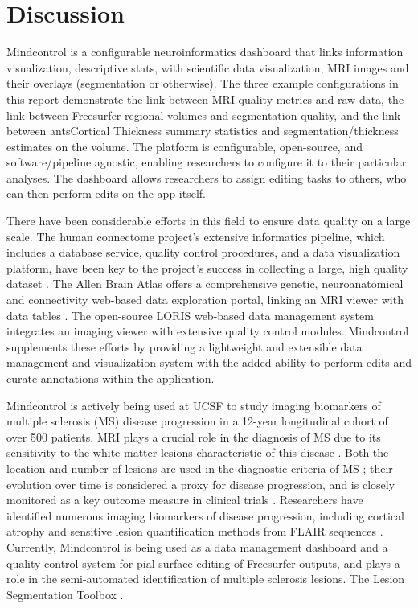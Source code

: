 \section{Discussion}

Mindcontrol is a configurable neuroinformatics dashboard that links information visualization, descriptive stats, with scientific data visualization, MRI images and their overlays (segmentation or otherwise). The three example configurations in this report demonstrate the link between MRI quality metrics and raw data, the link between Freesurfer regional volumes and segmentation quality, and the link between antsCortical Thickness summary statistics and segmentation/thickness estimates on the volume. The platform is configurable, open-source, and software/pipeline agnostic, enabling researchers to configure it to their particular analyses. The dashboard allows researchers to assign editing tasks to others, who can then perform edits on the app itself. 

There have been considerable efforts in this field to ensure data quality on a large scale. The human connectome project's extensive informatics pipeline, which includes a database service, quality control procedures, and a data visualization platform, have been key to the project's success in collecting a large, high quality dataset \cite{Marcus_2013}. The Allen Brain Atlas offers a comprehensive genetic, neuroanatomical and connectivity web-based data exploration portal, linking an MRI viewer with data tables \cite{Sunkin_2012}. The open-source LORIS web-based data management system integrates an imaging viewer with extensive quality control modules\cite{Das_2012}. Mindcontrol supplements these efforts by providing a lightweight and extensible data management and visualization system with the added ability to perform edits and curate annotations within the application. 

Mindcontrol is actively being used at UCSF to study imaging biomarkers of multiple sclerosis (MS) disease progression in a 12-year longitudinal cohort of over 500 patients. MRI plays a crucial role in the diagnosis of MS due to its sensitivity to the white matter lesions characteristic of this disease \cite{ge2006multiple}.  Both the location and number of lesions are used in the diagnostic criteria of MS \cite{mcdonald2001recommended}; their evolution over time is considered a proxy for disease progression, and is closely monitored as a key outcome measure in clinical trials \cite{ge2000glatiramer}. Researchers have identified numerous imaging biomarkers of disease progression, including cortical atrophy \cite{fisher2008gray} and sensitive lesion quantification methods from FLAIR sequences \cite{Schmidt_2012}. Currently, Mindcontrol is being used as a data management dashboard and a quality control system for pial surface editing of Freesurfer outputs, and plays a role in the semi-automated identification of multiple sclerosis lesions. The Lesion Segmentation Toolbox \cite{Schmidt_2012} .

